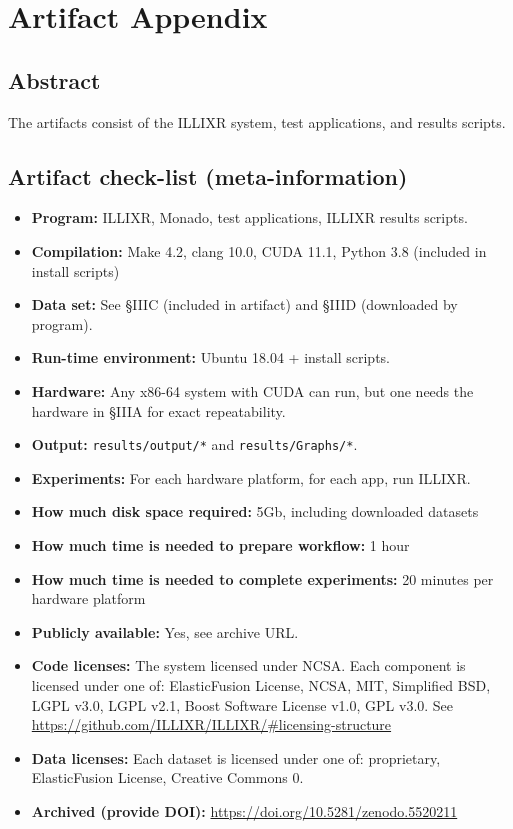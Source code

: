 \documentclass{sigplanconf}
\newcommand{\zenodo}{\footnotesize \url{https://doi.org/10.5281/zenodo.5520211}}
\begin{document}


\appendix
\section{Artifact Appendix}

\subsection{Abstract}

The artifacts consist of the ILLIXR system, test applications, and results scripts.

\subsection{Artifact check-list (meta-information)}

{\small
\begin{itemize}
  \item {\bf Program: } ILLIXR, Monado, test applications, ILLIXR results scripts.
  \item {\bf Compilation: } Make 4.2, clang 10.0, CUDA 11.1, Python 3.8 (included in install scripts)
  \item {\bf Data set: } See \S IIIC (included in artifact) and \S IIID (downloaded by program).
  \item {\bf Run-time environment: } Ubuntu 18.04 + install scripts.
  \item {\bf Hardware: } Any x86-64 system with CUDA can run, but one needs the hardware in \S IIIA for exact repeatability.
  \item {\bf Output: } \texttt{results/output/*} and \texttt{results/Graphs/*}.
  \item {\bf Experiments: } For each hardware platform, for each app, run ILLIXR.
  \item {\bf How much disk space required: } 5Gb, including downloaded datasets
  \item {\bf How much time is needed to prepare workflow: } 1 hour
  \item {\bf How much time is needed to complete experiments: } 20 minutes per hardware platform
  \item {\bf Publicly available: } Yes, see archive URL.
  \item {\bf Code licenses: } The system licensed under NCSA. Each component is licensed under one of: ElasticFusion License, NCSA, MIT, Simplified BSD, LGPL v3.0, LGPL v2.1, Boost Software License v1.0, GPL v3.0. See {\footnotesize \url{https://github.com/ILLIXR/ILLIXR/\#licensing-structure}}
  \item {\bf Data licenses: } Each dataset is licensed under one of: proprietary, ElasticFusion License, Creative Commons 0.
  \item {\bf Archived (provide DOI): } \zenodo
\end{itemize}
}
\end{document}
